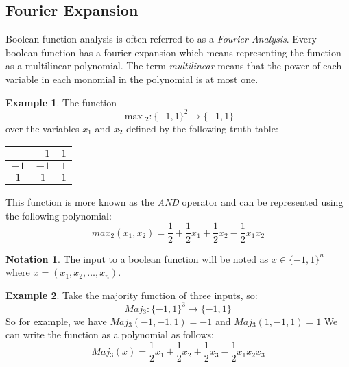 \documentclass[a4paper,titlepage,twocolumn]{book}
\theoremstyle{definition}
\newtheorem*{notation}{Notation}
\newtheorem{example}{Example}[section]
\newcommand{\half}{\ensuremath{\frac{1}{2}}}
\newcommand{\MOFunc}[2]{\ensuremath{#1:\MO[#2]\rightarrow \MO}}
\newcommand{\MO}[1][]{\ensuremath{\{-1,1\}^{#1}}}
\begin{document}
	\subsection{Fourier Expansion}
	Boolean function analysis is often referred to as a \emph{Fourier Analysis}. Every boolean function has a fourier expansion which means representing the function as a multilinear polynomial. The term \emph{multilinear} means that the power of each variable in each monomial in the polynomial is at most one.
	\begin{example}
		\label{and_function_example}
		The function \[\max{}_2:\MO[2]\rightarrow\MO\] over the variables $x_1$ and $x_2$ defined by the following truth table:
		\begin{center}
			\begin{tabular}{| c || c | c|}
				\hline 
				\diagbox{$x_1$}{$x_2$} & $-1$ & $1$ \\
				\hline \hline 
				$-1$ & $-1$ & $1$ \\
				\hline 
				$1$ & $1$ & $1$ \\
				\hline
			\end{tabular}
		\end{center}
	This function is more known as the \emph{AND} operator and can be represented using the following polynomial:
	\[max{}_2\left(x_1,x_2\right) = \frac{1}{2} + \frac{1}{2}x_1 +\frac{1}{2}x_2 - \frac{1}{2}x_1x_2 \]
	\end{example}
	\begin{notation}
		The input to a boolean function  will be noted as $x\in \MO[n]$ where $x=\left(x_1,x_2,\ldots,x_n\right)$. 
	\end{notation}
\begin{example}
	Take the majority function of three inputs, so:
	 \[\MOFunc{Maj{}_3}{3}\] 
	So for example, we have $Maj{}_3\left(-1,-1,1\right) = -1$ and
	$Maj{}_3\left(1,-1,1\right) = 1$
	We can write the function as a polynomial as follows:
	\[Maj{}_3\left(x\right) = \half x_1 + \half x_2 + \half x_3 - \half x_1 x_2 x_3\]
\end{example}
\end{document}
